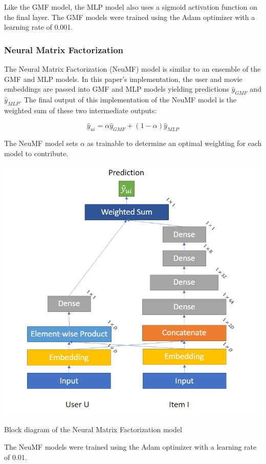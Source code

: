 \documentclass{article}
\begin{document}
Like the GMF model, the MLP model also uses a sigmoid activation function on the final layer. The GMF models were trained using the Adam optimizer with a learning rate of 0.001.

\subsubsection{Neural Matrix Factorization}
The Neural Matrix Factorization (NeuMF) model is similar to an ensemble of the GMF and MLP models. In this paper's implementation, the user and movie embeddings are passed into GMF and MLP models yielding predictions $\hat{y}_{GMF}$ and $\hat{y}_{MLP}$. The final output of this implementation of the NeuMF model is the weighted sum of these two intermediate outputs:

\[
\hat{y}_{ui} = \alpha\hat{y}_{GMF} + (1 - \alpha)\hat{y}_{MLP}
\]

The NeuMF model sets $\alpha$ as trainable to determine an optimal weighting for each model to contribute.

\begin{center}
\includegraphics[scale=0.4]{NeuMF_Diagram}

Block diagram of the Neural Matrix Factorization model
\end{center}

The NeuMF models were trained using the Adam optimizer with a learning rate of 0.01.
\end{document}
